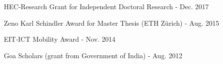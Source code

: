 
\begin{itemize}[leftmargin=*]

	\footnotesize{
	
	\item HEC-Research Grant for Independent Doctoral Research - Dec. 2017
	\vspace{-0.3cm}
	\item Zeno Karl Schindler Award for Master Thesis (ETH Zürich) - Aug. 2015
	\vspace{-0.3cm}
	\item EIT-ICT Mobility Award - Nov. 2014
	\vspace{-0.3cm}
	\item Goa Scholars (grant from Government of India)  - Aug. 2012
	}
\end{itemize}
	